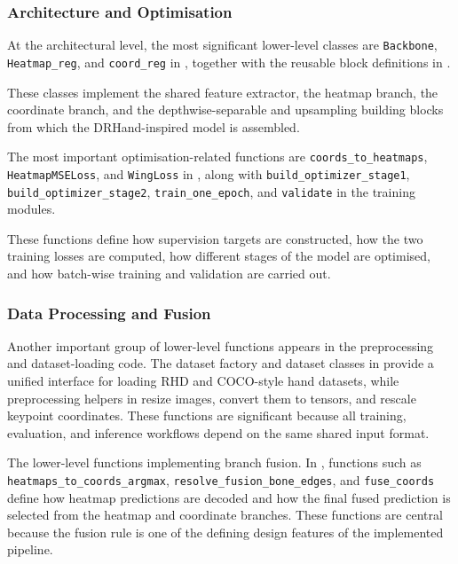 ﻿\documentclass[11pt,a4paper]{article}
\begin{document}
\subsubsection*{Architecture and Optimisation}

At the architectural level, the most significant lower-level classes are
\texttt{Backbone}, \texttt{Heatmap\_reg}, and \texttt{coord\_reg} in
, together with the reusable block
definitions in .

\medskip

These classes implement the shared feature extractor, the heatmap branch, the
coordinate branch, and the depthwise-separable and upsampling building blocks
from which the DRHand-inspired model is assembled.

\medskip

The most important optimisation-related functions are
\texttt{coords\_to\_heatmaps}, \texttt{HeatmapMSELoss}, and \texttt{WingLoss}
in , along with
\texttt{build\_optimizer\_stage1}, \texttt{build\_optimizer\_stage2},
\texttt{train\_one\_epoch}, and \texttt{validate} in the training modules.

These functions define how supervision targets are constructed, how the two
training losses are computed, how different stages of the model are optimised,
and how batch-wise training and validation are carried out.

\subsubsection*{Data Processing and Fusion}

Another important group of lower-level functions appears in the preprocessing
and dataset-loading code. The dataset factory and dataset classes in
 provide a unified interface for loading RHD and
COCO-style hand datasets, while preprocessing helpers in
 resize images, convert them to
tensors, and rescale keypoint coordinates.
These functions are significant because all training, evaluation, and
inference workflows depend on the same shared input format.

\medskip

The lower-level functions implementing branch fusion. 
In , functions such as
\texttt{heatmaps\_to\_coords\_argmax}, \texttt{resolve\_fusion\_bone\_edges},
and \texttt{fuse\_coords} define how heatmap predictions are decoded and how
the final fused prediction is selected from the heatmap and coordinate
branches.
These functions are central because the fusion rule is one of the defining
design features of the implemented pipeline.
\end{document}
